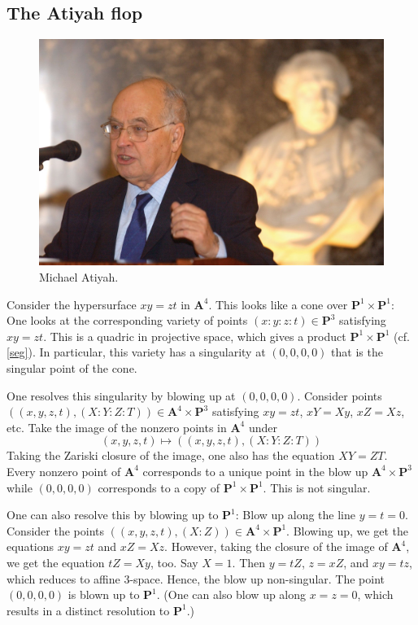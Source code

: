 \documentclass [11 pt, oneside, margin = 1 in] {article}
\begin{document}
\subsection{The Atiyah flop}
\begin{figure}
\begin{center}
\includegraphics[scale=0.15]{images/atiyah}
\caption{Michael Atiyah.}
\end{center}
\end{figure}
Consider the hypersurface $xy=zt$ in $\mathbf{A}^4$. This looks like a cone over $\mathbf{P}^1\times \mathbf{P}^1$: One looks at the corresponding variety of points $(x:y:z:t)\in \mathbf{P}^3$ satisfying $xy=zt$. This is a quadric in projective space, which gives a product $\mathbf{P}^1\times \mathbf{P}^1$ (cf. \cref{seg}). In particular, this variety has a singularity at $(0,0,0,0)$ that is the singular point of the cone.

One resolves this singularity by blowing up at $(0,0,0,0)$. Consider points $((x,y,z,t),  (X:Y:Z:T)) \in \mathbf{A}^4\times \mathbf{P}^3$ satisfying $xy=zt$, $xY=Xy$, $xZ = Xz$, etc. Take the image of the nonzero points in $\mathbf{A}^4$ under
\[
	(x,y,z,t)\longmapsto  ((x,y,z,t),  (X:Y:Z:T))
	\]
	Taking the Zariski closure of the image, one also has the equation $XY=ZT$. Every nonzero point of $\mathbf{A}^4$ corresponds to a unique point in the blow up $\mathbf{A}^4\times \mathbf{P}^3$ while $(0,0,0,0)$ corresponds to a copy of $\mathbf{P}^1\times \mathbf{P}^1$. This is not singular.

	One can also resolve this by blowing up to $\mathbf{P}^1$: Blow up along the line $y=t=0$. Consider the points $((x,y,z,t),  (X:Z)) \in \mathbf{A}^4\times \mathbf{P}^1$. Blowing up, we get the equations $xy=zt$ and $xZ=Xz$. However, taking the closure of the image of $\mathbf{A}^4$, we get the equation $tZ = Xy$, too. Say $X=1$. Then $y=tZ$, $z=xZ$, and $xy=tz$, which reduces to affine $3$-space. Hence, the blow up non-singular. The point $(0,0,0,0)$ is blown up to $\mathbf{P}^1$. (One can also blow up along $x=z=0$, which results in a distinct resolution to $\mathbf{P}^1$.)
\end{document}
